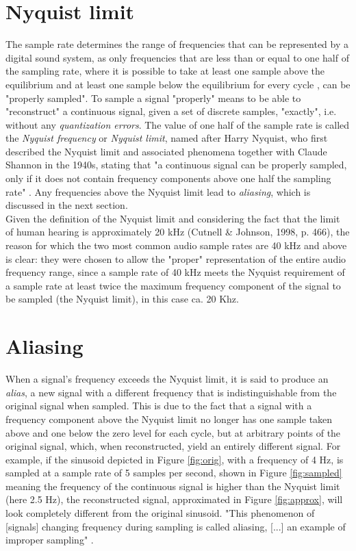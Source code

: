 \documentclass[12pt]{report}
\begin{document}
\section{Nyquist limit}

The sample rate determines the range of frequencies that can be represented by a digital sound system, as only frequencies that are less than or equal to one half of the sampling rate, where it is possible to take at least one sample above the equilibrium and at least one sample below the equilibrium for every cycle , can be "properly sampled". To sample a signal "properly" means to be able to "reconstruct" a continuous signal, given a set of discrete samples, "exactly", i.e. without any \emph{quantization errors}. The value of one half of the sample rate is called the \emph{Nyquist frequency} or \emph{Nyquist limit}, named after Harry Nyquist, who first described the Nyquist limit and associated phenomena together with Claude Shannon in the 1940s, stating that "a continuous signal can be properly sampled, only if it does not contain frequency components above one half the sampling rate" . Any frequencies above the Nyquist limit lead to \emph{aliasing}, which is discussed in the next section.\\

Given the definition of the Nyquist limit and considering the fact that the limit of human hearing is approximately 20 kHz (Cutnell \& Johnson, 1998, p. 466), the reason for which the two most common audio sample rates are 40 kHz and above is clear: they were chosen to allow the "proper" representation of the entire audio frequency range, since a sample rate of 40 kHz meets the Nyquist requirement of a sample rate at least twice the maximum frequency component of the signal to be sampled (the Nyquist limit), in this case ca. 20 Khz.

\section{Aliasing}

When a signal's frequency exceeds the Nyquist limit, it is said to produce an \emph{alias}, a new signal with a different frequency that is indistinguishable from the original signal when sampled. This is due to the fact that a signal with a frequency component above the Nyquist limit no longer has one sample taken above and one below the zero level for each cycle, but at arbitrary points of the original signal, which, when reconstructed, yield an entirely different signal. For example, if the sinusoid depicted in Figure \ref{fig:orig}, with a frequency of 4 Hz, is sampled at a sample rate of 5 samples per second, shown in Figure \ref{fig:sampled} meaning the frequency of the continuous signal is higher than the Nyquist limit (here 2.5 Hz), the reconstructed signal, approximated in Figure \ref{fig:approx}, will look completely different from the original sinusoid. "This phenomenon of [signals] changing frequency during sampling is called aliasing, [...] an example of improper sampling" .
\end{document}
